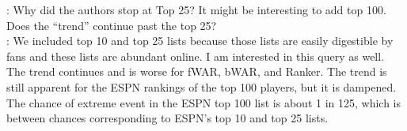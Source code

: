 \documentclass[11pt]{article}
\begin{document}
:
Why did the authors stop at Top 25?  It might be interesting to add top 100.  
Does the ``trend'' continue past the top 25? \\

: We included top 10 and top 25 lists because those 
lists are easily digestible by fans and these lists are abundant online.  
I am interested in this query as well.  The trend continues and is worse for 
fWAR, bWAR, and Ranker.  The trend is still apparent for the ESPN rankings 
of the top 100 players, but it is dampened.  The chance of extreme event in 
the ESPN top 100 list is about 1 in 125, which is between chances 
corresponding to ESPN's top 10 and top 25 lists.
 
\end{document}
